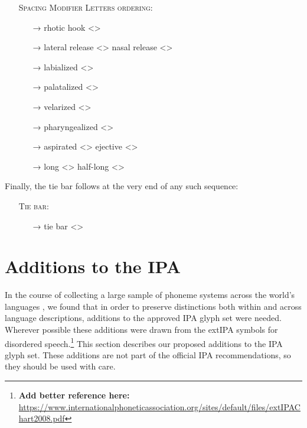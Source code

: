 \begin{itemize}
	\item[] \textsc{Spacing Modifier Letters ordering:}
	\begin{itemize}
	  \item[→] rhotic hook <>
	  \item[→] lateral release <> \textbar{} nasal release <>
	  \item[→] labialized <>
	  \item[→] palatalized <>
	  \item[→] velarized <>
	  \item[→] pharyngealized <>
	  \item[→] aspirated <> \textbar{} ejective <>
	  \item[→] long <> \textbar{} half-long <>
	\end{itemize}
\end{itemize}

\noindent Finally, the tie bar follows at the very end of any such sequence:

\begin{itemize}
  \item[] \textsc{Tie bar:}
  \begin{itemize}
    \item[→] tie bar <>
  \end{itemize}
\end{itemize}

\section{Additions to the IPA}
\label{ipa-additions}

In the course of collecting a large sample of phoneme systems across the world's
languages \citep{Moran2012}, we found that in order to preserve distinctions
both within and across language descriptions, additions to the approved IPA
glyph set were needed. Wherever possible these additions were drawn from the
extIPA symbols for disordered
speech.\footnote{\textbf{Add better reference here: }\url{https://www.internationalphoneticassociation.org/sites/default/files/extIPAChart2008.pdf}}
This section describes our proposed additions to the IPA glyph set. These
additions are not part of the official IPA recommendations, so they should be 
used with care.

